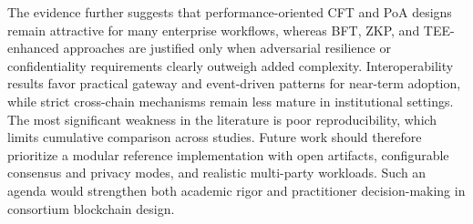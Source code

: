 \documentclass[journal]{IEEEtran}
\begin{document}
The evidence further suggests that performance-oriented CFT and PoA designs remain attractive for many enterprise workflows, whereas BFT, ZKP, and TEE-enhanced approaches are justified only when adversarial resilience or confidentiality requirements clearly outweigh added complexity. Interoperability results favor practical gateway and event-driven patterns for near-term adoption, while strict cross-chain mechanisms remain less mature in institutional settings. The most significant weakness in the literature is poor reproducibility, which limits cumulative comparison across studies. Future work should therefore prioritize a modular reference implementation with open artifacts, configurable consensus and privacy modes, and realistic multi-party workloads. Such an agenda would strengthen both academic rigor and practitioner decision-making in consortium blockchain design.



\end{document}
